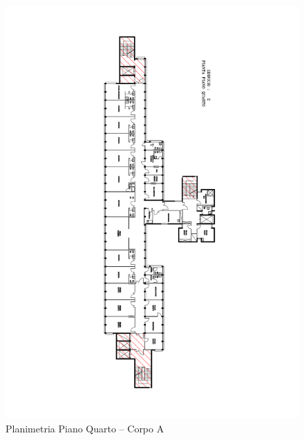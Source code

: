 \begin{figure}
	\centering
	\includegraphics[width=\hsize]{6_2_cap/img/P4}
	\caption{Planimetria Piano Quarto -- Corpo A}
	\label{img:P4}
\end{figure}

\clearpage
